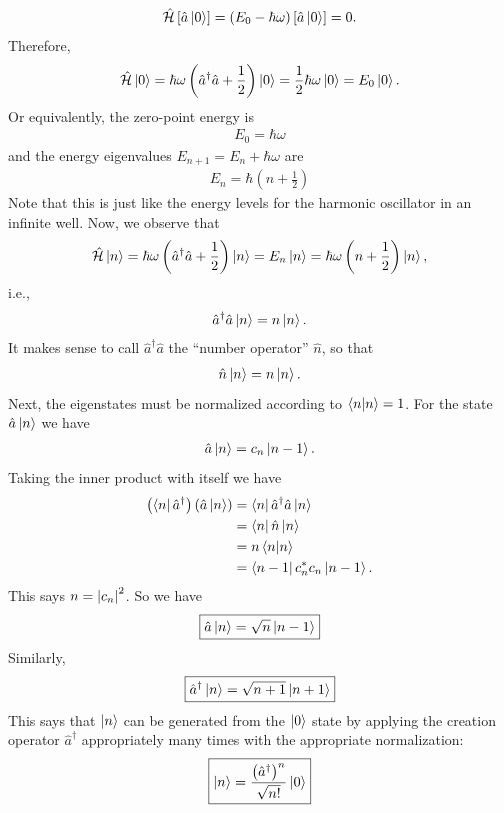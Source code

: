 \documentclass{book}
\theoremstyle{definition}
\newcommand{\ham}{\mathcal{H}}
\newcommand{\f}[2]{\frac{#1}{#2}}
\newcommand{\lp}{\left(}
\newcommand{\rp}{\right)}
\newcommand{\lb}{\left[}
\newcommand{\rb}{\right]}
\begin{document}
\begin{align}
\hat{\ham}\lb \hat{a}\ket{0} \rb  = (E_0 - \hbar\omega)\lb \hat{a}\ket{0}\rb = 0.
\end{align}
Therefore,
\begin{align}
\hat{\ham}\ket{0} = \hbar\omega\lp \hat{a}^\dagger\hat{a} + \f{1}{2}\rp\ket{0} = \f{1}{2}\hbar\omega\ket{0} = E_0\ket{0}.
\end{align}
Or equivalently, the zero-point energy is 
\begin{align}
E_0 = \hbar\omega
\end{align}
and the energy eigenvalues $E_{n+1} = E_n + \hbar\omega$ are
\begin{align}
\boxed{E_n = \hbar\lp n + \f{1}{2}\rp}
\end{align}
Note that this is just like the energy levels for the harmonic oscillator in an infinite well. Now, we observe that
\begin{align}
\hat{\ham}\ket{n} = \hbar\omega\lp \hat{a}^\dagger\hat{a} + \f{1}{2}\rp \ket{n} = E_n\ket{n} = \hbar\omega\lp n + \f{1}{2} \rp\ket{n},
\end{align}
i.e.,
\begin{align}
\hat{a}^\dagger\hat{a}\ket{n} = n\ket{n}.
\end{align}
It makes sense to call $\hat{a}^\dagger\hat{a}$ the ``number operator'' $\hat{n}$, so that 
\begin{align}
\hat{n}\ket{n} = n\ket{n}.
\end{align}
Next, the eigenstates must be normalized according to $\braket{n} = 1$. For the state $\hat{a}\ket{n}$ we have
\begin{align}
\hat{a}\ket{n} = c_n\ket{n-1}.
\end{align}
Taking the inner product with itself we have
\begin{align}
\lp\bra{n}\hat{a}^\dagger\rp\lp\hat{a}\ket{n}\rp &= \bra{n}\hat{a}^\dagger\hat{a}\ket{n}\\
&= \bra{n}\hat{n}\ket{n}\\
&= n\braket{n}\\
&= \bra{n-1}c_n^*c_n\ket{n-1}.
\end{align}
This says $n = \abs{c_n}^2$. So we have
\begin{align}
\boxed{\hat{a}\ket{n} = \sqrt{n}\ket{n-1}}
\end{align}
Similarly, 
\begin{align}
\boxed{\hat{a}^\dagger\ket{n} = \sqrt{n+1}\ket{n+1}}
\end{align}
This says that $\ket{n}$ can be generated from the $\ket{0}$ state by applying the creation operator $\hat{a}^\dagger$ appropriately many times with the appropriate normalization:
\begin{align}
\boxed{\ket{n} = \f{{\lp\hat{a}^\dagger\rp}^n}{\sqrt{n!}}\ket{0}}
\end{align}
\end{document}
